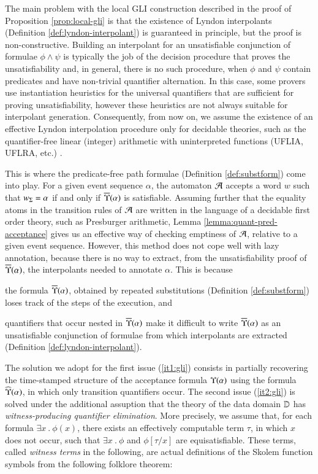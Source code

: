The main problem with the local GLI construction described in the
proof of Proposition \ref{prop:local-gli} is that the existence of
Lyndon interpolants (Definition \ref{def:lyndon-interpolant}) is
guaranteed in principle, but the proof is non-constructive. Building
an interpolant for an unsatisfiable conjunction of formulae $\phi
\wedge \psi$ is typically the job of the decision procedure that
proves the unsatisfiability and, in general, there is no such
procedure, when $\phi$ and $\psi$ contain predicates and have
non-trivial quantifier alternation. In this case, some provers use
instantiation heuristics for the universal quantifiers that are
sufficient for proving unsatisfiability, however these heuristics are
not always suitable for interpolant generation. Consequently, from now
on, we assume the existence of an effective Lyndon interpolation
procedure only for decidable theories, such as the quantifier-free
linear (integer) arithmetic with uninterpreted functions (UFLIA,
UFLRA, etc.) \cite{RybalchenkoSofronieStokkermans}. 

This is where the predicate-free path formulae (Definition
\ref{def:substform}) come into play. For a given event sequence
$\alpha$, the automaton $\mathcal{A}$ accepts a word $w$ such that ${w}_\Sigma =
\alpha$ if and only if $\overline{\Upsilon}({\alpha})$ is satisfiable. Assuming
further that the equality atoms in the transition rules of $\mathcal{A}$ are
written in the language of a decidable first order theory, such as
Presburger arithmetic, Lemma \ref{lemma:quant-pred-acceptance} gives
us an effective way of checking emptiness of $\mathcal{A}$, relative to a given
event sequence. However, this method does not cope well with lazy
annotation, because there is no way to extract, from the
unsatisfiability proof of $\overline{\Upsilon}({\alpha})$, the interpolants
needed to annotate $\alpha$. This is because \begin{inparaenum}[(i)]
\item\label{it1:gli} the formula $\overline{\Upsilon}({\alpha})$, obtained by
  repeated substitutions (Definition \ref{def:substform}) loses track
  of the steps of the execution, and
%
\item\label{it2:gli} quantifiers that occur nested in
  $\overline{\Upsilon}({\alpha})$ make it difficult to write $\overline{\Upsilon}({\alpha})$
  as an unsatisfiable conjunction of formulae from which interpolants
  are extracted (Definition \ref{def:lyndon-interpolant}).
\end{inparaenum}

The solution we adopt for the first issue (\ref{it1:gli}) consists in
partially recovering the time-stamped structure of the acceptance
formula $\Upsilon({\alpha})$ using the formula $\widehat{\Upsilon}({\alpha})$, in
which only transition quantifiers occur. The second issue
(\ref{it2:gli}) is solved under the additional assuption that the
theory of the data domain $\mathbb{D}$ has \emph{witness-producing
  quantifier elimination}. More precisely, we assume that, for each
formula $\exists x ~.~ \phi(x)$, there exists an effectively
computable term $\tau$, in which $x$ does not occur, such that
$\exists x ~.~ \phi$ and $\phi[\tau/x]$ are equisatisfiable. These
terms, called \emph{witness terms} in the following, are actual
definitions of the Skolem function symbols from the following folklore
theorem:

